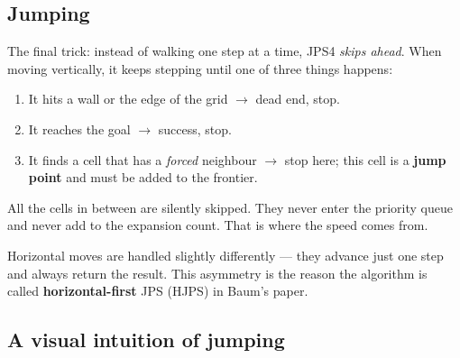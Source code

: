 \documentclass[11pt,a4paper]{article}
\newcommand{\gridbase}[2]{%
  \draw[step=0.6,gray!50,very thin] (0,0) grid (#1*0.6,#2*0.6);
  \draw[black,thick] (0,0) rectangle (#1*0.6,#2*0.6);
}
\newcommand{\fillcell}[3]{%
  \fill[#3] (#1*0.6,#2*0.6) rectangle ({(#1+1)*0.6},{(#2+1)*0.6});
  \draw[gray!50,very thin] (#1*0.6,#2*0.6) rectangle ({(#1+1)*0.6},{(#2+1)*0.6});
}
\newcommand{\celltext}[3]{%
  \node at ({(#1+0.5)*0.6},{(#2+0.5)*0.6}) {\footnotesize #3};
}
\begin{document}
\subsection{Jumping}

The final trick: instead of walking one step at a time, JPS4 \emph{skips ahead}. When moving vertically, it keeps stepping until one of three things happens:

\begin{enumerate}[leftmargin=20pt,itemsep=2pt]
  \item It hits a wall or the edge of the grid $\rightarrow$ dead end, stop.
  \item It reaches the goal $\rightarrow$ success, stop.
  \item It finds a cell that has a \emph{forced} neighbour $\rightarrow$ stop here; this cell is a \textbf{jump point} and must be added to the frontier.
\end{enumerate}

\noindent All the cells in between are silently skipped. They never enter the priority queue and never add to the expansion count. That is where the speed comes from.

Horizontal moves are handled slightly differently --- they advance just one step and always return the result. This asymmetry is the reason the algorithm is called \textbf{horizontal-first} JPS (HJPS) in Baum's paper.

\subsection{A visual intuition of jumping}

\begin{center}
\end{center}
\end{document}
